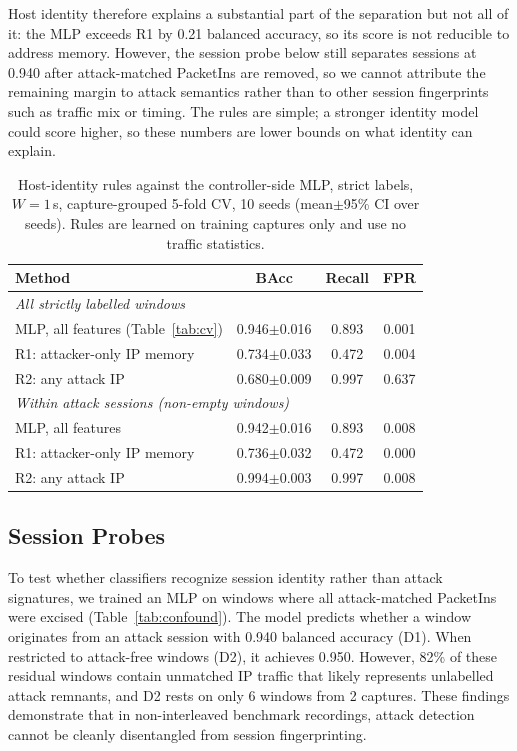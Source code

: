 \documentclass[journal]{IEEEtran}
\begin{document}
Host identity therefore explains a substantial part of the separation but not all of it: the MLP exceeds R1 by 0.21 balanced accuracy, so its score is not reducible to address memory. However, the session probe below still separates sessions at 0.940 after attack-matched PacketIns are removed, so we cannot attribute the remaining margin to attack semantics rather than to other session fingerprints such as traffic mix or timing. The rules are simple; a stronger identity model could score higher, so these numbers are lower bounds on what identity can explain.

\begin{table}[t]
\caption{Host-identity rules against the controller-side MLP, strict labels, $W{=}1$\,s, capture-grouped 5-fold CV, 10 seeds (mean{\scriptsize$\pm$}95\% CI over seeds). Rules are learned on training captures only and use no traffic statistics.}
\label{tab:identity}
\centering\footnotesize\setlength{\tabcolsep}{3pt}
\begin{tabular}{lccc}
\toprule
Method & BAcc & Recall & FPR \\
\midrule
\multicolumn{4}{l}{\emph{All strictly labelled windows}} \\
MLP, all features (Table~\ref{tab:cv}) & 0.946{\scriptsize$\pm$0.016} & 0.893 & 0.001 \\
R1: attacker-only IP memory & 0.734{\scriptsize$\pm$0.033} & 0.472 & 0.004 \\
R2: any attack IP & 0.680{\scriptsize$\pm$0.009} & 0.997 & 0.637 \\
\midrule
\multicolumn{4}{l}{\emph{Within attack sessions (non-empty windows)}} \\
MLP, all features & 0.942{\scriptsize$\pm$0.016} & 0.893 & 0.008 \\
R1: attacker-only IP memory & 0.736{\scriptsize$\pm$0.032} & 0.472 & 0.000 \\
R2: any attack IP & 0.994{\scriptsize$\pm$0.003} & 0.997 & 0.008 \\
\bottomrule
\end{tabular}
\end{table}

\subsection{Session Probes}
To test whether classifiers recognize session identity rather than attack signatures, we trained an MLP on windows where all attack-matched PacketIns were excised (Table~\ref{tab:confound}). The model predicts whether a window originates from an attack session with 0.940 balanced accuracy (D1). When restricted to attack-free windows (D2), it achieves 0.950. However, 82\% of these residual windows contain unmatched IP traffic that likely represents unlabelled attack remnants, and D2 rests on only 6 windows from 2 captures. These findings demonstrate that in non-interleaved benchmark recordings, attack detection cannot be cleanly disentangled from session fingerprinting.
\end{document}
